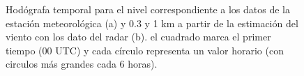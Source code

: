 \documentclass[12pt,spanish,oneside, a4paper]{book}
\begin{document}
\begin{figure}

{\centering {}\newline{}

}

\caption{Hodógrafa temporal para el nivel correspondiente a los datos de la estación meteorológica (a) y 0.3 y 1 km a partir de la estimación del viento con los dato del radar (b). el cuadrado marca el primer tiempo (00 UTC) y cada círculo representa un valor horario (con circulos más grandes cada 6 horas). \label{hodografa-n}}\label{fig:hodografa-nivel}
\end{figure}
\end{document}
